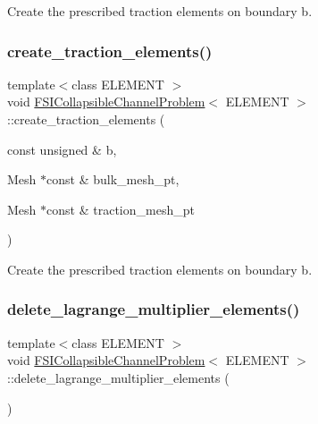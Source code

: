 Create the prescribed traction elements on boundary b. 

\mbox{\label{classFSICollapsibleChannelProblem_af7352e5fd5ea8965adbc9505749442a3}} 
\subsubsection{\texorpdfstring{create\+\_\+traction\+\_\+elements()}{create\_traction\_elements()}\hspace{0.1cm}{\footnotesize\ttfamily [4/4]}}
{\footnotesize\ttfamily template$<$class E\+L\+E\+M\+E\+NT $>$ \\
void \hyperlink{classFSICollapsibleChannelProblem}{F\+S\+I\+Collapsible\+Channel\+Problem}$<$ E\+L\+E\+M\+E\+NT $>$\+::create\+\_\+traction\+\_\+elements (\begin{DoxyParamCaption}\item[{const unsigned \&}]{b,  }\item[{Mesh $\ast$const \&}]{bulk\+\_\+mesh\+\_\+pt,  }\item[{Mesh $\ast$const \&}]{traction\+\_\+mesh\+\_\+pt }\end{DoxyParamCaption})\hspace{0.3cm}{\ttfamily [private]}}



Create the prescribed traction elements on boundary b. 

\mbox{\label{classFSICollapsibleChannelProblem_ab853c978c8e94505cd36781569b1dbf1}} 
\subsubsection{\texorpdfstring{delete\+\_\+lagrange\+\_\+multiplier\+\_\+elements()}{delete\_lagrange\_multiplier\_elements()}\hspace{0.1cm}{\footnotesize\ttfamily [1/2]}}
{\footnotesize\ttfamily template$<$class E\+L\+E\+M\+E\+NT $>$ \\
void \hyperlink{classFSICollapsibleChannelProblem}{F\+S\+I\+Collapsible\+Channel\+Problem}$<$ E\+L\+E\+M\+E\+NT $>$\+::delete\+\_\+lagrange\+\_\+multiplier\+\_\+elements (\begin{DoxyParamCaption}{ }\end{DoxyParamCaption})\hspace{0.3cm}{\ttfamily [private]}}

